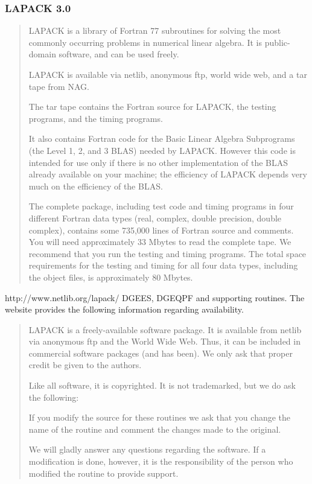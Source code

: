 \documentclass{article}
\begin{document}
\subsubsection{ LAPACK 3.0}


\label{sec:lapack}


\begin{quote}
  
LAPACK is a library of Fortran 77 subroutines for solving
the most commonly occurring problems in numerical linear algebra.
It is public-domain software, and can be used freely.

LAPACK is available via netlib, anonymous ftp, world wide web, and a
tar tape from NAG.

The tar tape contains the Fortran source for LAPACK, the testing programs, and
the timing programs.

It also contains Fortran code for the Basic Linear Algebra Subprograms
(the Level 1, 2, and 3 BLAS) needed by LAPACK.
However this code is intended for use only if there is no other implementation
of the BLAS already available on your machine; the efficiency of LAPACK
depends very much on the efficiency of the BLAS.

The complete package, including test code and timing programs in four
different Fortran data types (real, complex, double precision, double
complex), contains some 735,000 lines of Fortran source and comments.
You will need approximately 33 Mbytes to read the complete tape.
We recommend that you run the testing and timing programs.
The total space requirements for the testing and timing for all four data
types, including the object files, is approximately 80 Mbytes.
\end{quote}



 http://www.netlib.org/lapack/
DGEES, DGEQPF and supporting routines. The website provides the following information
regarding availability.
\begin{quote}


LAPACK is a freely-available software package. 
It is available from netlib via anonymous ftp and the World Wide Web. 
Thus, it can be included in
commercial software packages (and has been). 
We only ask that proper credit be given to the authors.

Like all software, it is copyrighted. 
It is not trademarked, but we do ask the following:

If you modify the source for these routines we ask that 
you change the name of the routine and comment the changes 
made to the original.

We will gladly answer any questions regarding the software. 
If a modification is done, however, 
it is the responsibility of the person who modified the
routine to provide support.
\end{quote}
\end{document}
